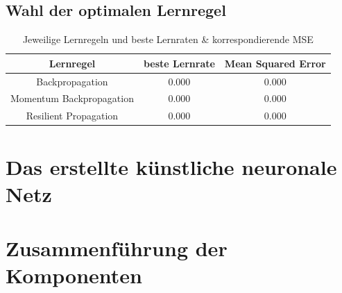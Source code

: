 \subsection{Wahl der optimalen Lernregel} %

\begin{table}[H]
  \centering
  \begin{tabular}{|c|c|c|}
  \hline 
  \rule[0ex]{0pt}{2.5ex} Lernregel & beste Lernrate & Mean Squared Error \\ 
  \hline 
  \rule[0ex]{0pt}{2.5ex} Backpropagation & 0.000 & 0.000 \\ 
  \hline 
  \rule[0ex]{0pt}{2.5ex} Momentum Backpropagation & 0.000 & 0.000\\ 
  \hline 
  \rule[0ex]{0pt}{2.5ex} Resilient Propagation & 0.000 & 0.000 \\ 
  \hline 
  \end{tabular} 
  \caption{Jeweilige Lernregeln und beste Lernraten \& korrespondierende MSE}
  \label{tab:tab3}
\end{table}
\section{Das erstellte künstliche neuronale Netz}

\section{Zusammenführung der Komponenten}
